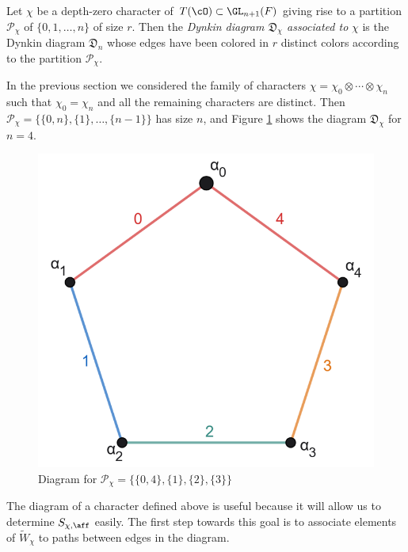     \begin{definition}
        Let $\chi$ be a depth-zero character of $T(\cO)\subset\GL_{n+1}(F)$ giving rise to a partition $\mathcal{P}_\chi$ of $\{0,1,\ldots,n\}$ of size $r$. Then the \textit{Dynkin diagram $\mathfrak{D}_\chi$ associated to} $\chi$ is the Dynkin diagram $\mathfrak{D}_n$ whose edges have been colored in $r$ distinct colors according to the partition $\mathcal{P}_\chi$.        
    \end{definition}
    \begin{example}
        In the previous section we considered the family of characters $\chi=\chi_0\otimes\cdots\otimes\chi_n$ such that $\chi_0=\chi_n$ and all the remaining characters are distinct. Then $\mathcal{P}_\chi=\{\{0,n\},\{1\},\ldots,\{n-1\}\}$ has size $n$, and Figure \ref{fig_diagn4} shows the diagram $\mathfrak{D}_\chi$ for $n=4$.
        \begin{figure}[h]
            \begin{center}
                \includegraphics[scale=0.6]{dynkin_diagram_labels.png}
                \caption{Diagram for $\mathcal{P}_\chi=\{\{0,4\},\{1\},\{2\},\{3\}\}$}
                \label{fig_diagn4}
            \end{center}
        \end{figure}
    \end{example}


    The diagram of a character defined above is useful because it will allow us to determine $S_{\chi,\aff}$ easily. The first step towards this goal is to associate elements of $\widetilde{W}_\chi$ to paths between edges in the diagram.

